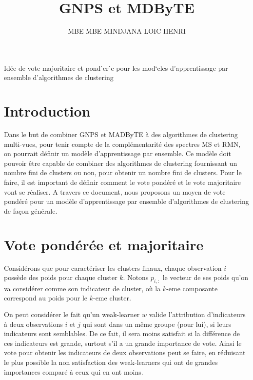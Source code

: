 \documentclass[12pt, french, latin.medieval, a4paper]{report}
\author{MBE MBE MINDJANA LOIC HENRI}
\title{GNPS et MDByTE}
\begin{document}
    
    \pagecouverture
    {Idée de vote majoritaire et pond ́er ́e pour les mod`eles d’apprentissage
par ensemble d’algorithmes de clustering}
    {}
	\tableofcontents
	\vspace{20cm}
    
    \section{Introduction}
    Dans le but de combiner GNPS et MADByTE à des algorithmes de clustering multi-vues, pour tenir compte de la complémentarité des spectres MS et RMN, on pourrait définir un modèle d’apprentissage par ensemble.
Ce modèle doit pouvoir être capable de combiner des algorithmes de clustering fournissant un nombre fini de clusters ou non, pour obtenir un nombre fini de clusters.
    	Pour le faire, il est important de définir comment le vote pondéré et le vote majoritaire vont se réaliser.
   	A travers ce document, nous proposons un moyen de vote pondéré pour un modèle d'apprentissage par ensemble d'algorithmes de clustering de façon générale.

    \section{Vote pondérée et majoritaire}
   	 Considérons que pour caractériser les clusters finaux, chaque observation $i$ possède des poids pour chaque cluster $k$. 
Notons $p_{i,:}$ le vecteur de ses poids qu’on va considérer comme son indicateur de cluster, où la $k$-eme composante correspond au poids pour le $k$-eme cluster.
   	 
   	 On peut considérer le fait qu'un weak-learner $w$ valide l'attribution d’indicateurs à deux observations $i$ et $j$ qui sont dans un même groupe (pour lui), si leurs indicateurs sont semblables.
   	 De ce fait, il sera moins satisfait si la différence de ces indicateurs est grande, surtout s'il a un grande importance de vote. Ainsi le vote pour obtenir les indicateurs de deux observations peut se faire, en réduisant le plus possible la non satisfaction des weak-learners qui ont de grandes importances comparé à ceux qui en ont moins.
\end{document}
